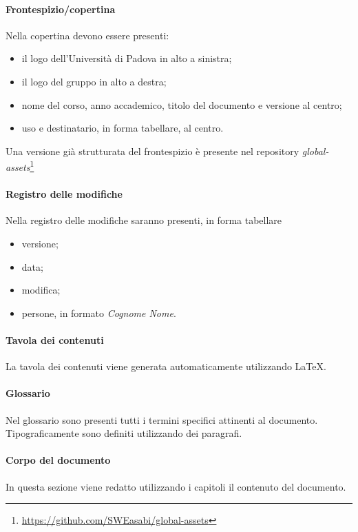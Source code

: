 \paragraph{Frontespizio/copertina} Nella copertina devono essere presenti:
\begin{itemize}
    \item il logo dell'Università di Padova in alto a sinistra;
    \item il logo del gruppo in alto a destra;
    \item nome del corso, anno accademico, titolo del documento e versione al centro;
    \item uso e destinatario, in forma tabellare, al centro.
\end{itemize}
Una versione già strutturata del frontespizio è presente nel repository \textit{global-assets}\footnote{\href{https://github.com/SWEasabi/global-assets}{https://github.com/SWEasabi/global-assets}}

\paragraph{Registro delle modifiche} Nella registro delle modifiche saranno presenti, in forma tabellare
\begin{itemize}
    \item versione;
    \item data;
    \item modifica;
    \item persone, in formato \textit{Cognome Nome}.
\end{itemize}

\paragraph{Tavola dei contenuti} La tavola dei contenuti viene generata automaticamente utilizzando \LaTeX.

\paragraph{Glossario} Nel glossario sono presenti tutti i termini specifici attinenti al documento. Tipograficamente sono definiti utilizzando dei paragrafi.

\paragraph{Corpo del documento} In questa sezione viene redatto utilizzando i capitoli il contenuto del documento.

